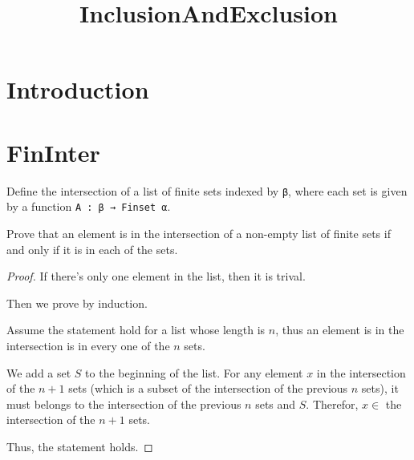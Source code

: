 \title{InclusionAndExclusion}




\maketitle


\tableofcontents

\nocite{*} %

\section{Introduction}


\section{FinInter}

\begin{definition}\label{List.FinInter}
  \leanok
  Define the intersection of a list of finite sets indexed by \verb|β|, where each set is given by a function \verb|A : β → Finset α|.
\end{definition}

\begin{lemma}\label{List.eq_FinInter}
  \leanok
  Prove that an element is in the intersection of a non-empty list of finite sets if and only if it is in each of the sets.
\end{lemma}

\begin{proof}
  \leanok
  If there's only one element in the list, then it is trival.

  Then we prove by induction.

  Assume the statement hold for a list whose length is $n$, thus an element is in the intersection is in every one of the $n$ sets.

  We add a set $S$ to the beginning of the list. For any element $x$ in the intersection of the $n+1$ sets (which is a subset of the intersection of the previous $n$ sets), it must belongs to the intersection of the previous $n$ sets and $S$. Therefor, $x\in$ the intersection of the $n+1$ sets.

  Thus, the statement holds.

\end{proof}

